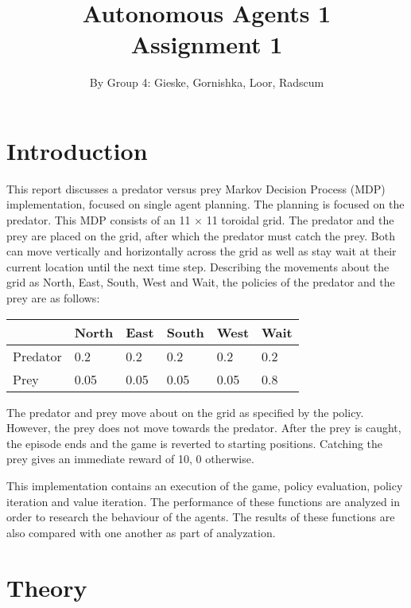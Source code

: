 \documentclass{article}
\begin{document}
\title{Autonomous Agents 1 \\ Assignment 1}

\author{By Group 4: Gieske, Gornishka, Loor, Radscum}
\maketitle

\pagebreak

\section*{Introduction}
This report discusses a predator versus prey Markov Decision Process (MDP) implementation, focused on single agent planning. The planning is focused on the predator. This MDP consists of an 11 $\times$ 11 toroidal grid. The predator and the prey are placed on the grid, after which the  predator must catch the prey. Both can move vertically and horizontally across the grid as well as stay wait at their current location until the next time step. Describing the movements about the grid as North, East, South, West and Wait, the policies of the predator and the prey are as follows:
\begin{center}
	\begin{tabular}{ | l | l | l | l | l | l |}
	\hline
	& North & East & South & West & Wait\\
	\hline
	Predator & 0.2 & 0.2 & 0.2 & 0.2 & 0.2 \\ 
	\hline
	Prey & 0.05 & 0.05 & 0.05 & 0.05 & 0.8 \\
	\hline
	\end{tabular}
\end{center}
The predator and prey move about on the grid as specified by the policy. However, the prey does not move towards the predator. After the prey is caught, the episode ends and the game is reverted to starting positions. Catching the prey gives an immediate reward of 10, 0 otherwise.

This implementation contains an execution of the game, policy evaluation, policy iteration and value iteration. The performance of these functions are analyzed in order to research the behaviour of the agents. The results of these functions are also compared with one another as part of analyzation.

\pagebreak

\section*{Theory}
\end{document}
